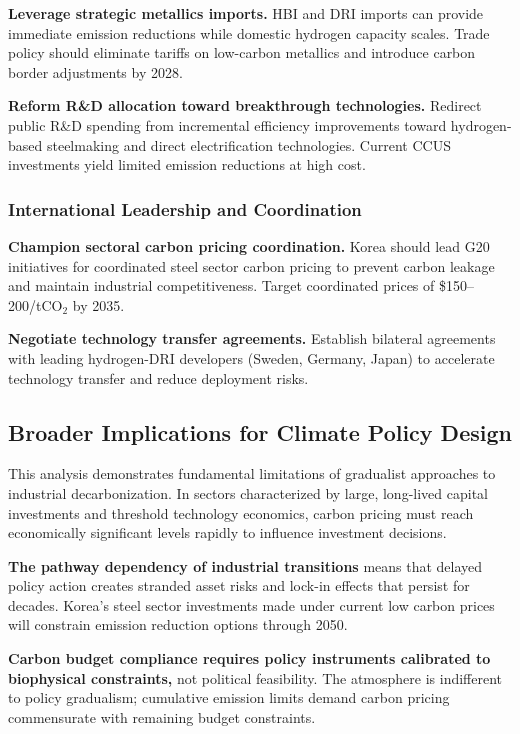 \documentclass[preprint,1p,authoryear]{elsarticle}
\begin{document}
\textbf{Leverage strategic metallics imports.} HBI and DRI imports can provide immediate emission reductions while domestic hydrogen capacity scales. Trade policy should eliminate tariffs on low-carbon metallics and introduce carbon border adjustments by 2028.

\textbf{Reform R\&D allocation toward breakthrough technologies.} Redirect public R\&D spending from incremental efficiency improvements toward hydrogen-based steelmaking and direct electrification technologies. Current CCUS investments yield limited emission reductions at high cost.

\subsubsection{International Leadership and Coordination}

\textbf{Champion sectoral carbon pricing coordination.} Korea should lead G20 initiatives for coordinated steel sector carbon pricing to prevent carbon leakage and maintain industrial competitiveness. Target coordinated prices of \$150--200/tCO$_2$ by 2035.

\textbf{Negotiate technology transfer agreements.} Establish bilateral agreements with leading hydrogen-DRI developers (Sweden, Germany, Japan) to accelerate technology transfer and reduce deployment risks.

\subsection{Broader Implications for Climate Policy Design}

This analysis demonstrates fundamental limitations of gradualist approaches to industrial decarbonization. In sectors characterized by large, long-lived capital investments and threshold technology economics, carbon pricing must reach economically significant levels rapidly to influence investment decisions.

\textbf{The pathway dependency of industrial transitions} means that delayed policy action creates stranded asset risks and lock-in effects that persist for decades. Korea's steel sector investments made under current low carbon prices will constrain emission reduction options through 2050.

\textbf{Carbon budget compliance requires policy instruments calibrated to biophysical constraints,} not political feasibility. The atmosphere is indifferent to policy gradualism; cumulative emission limits demand carbon pricing commensurate with remaining budget constraints.
\end{document}
